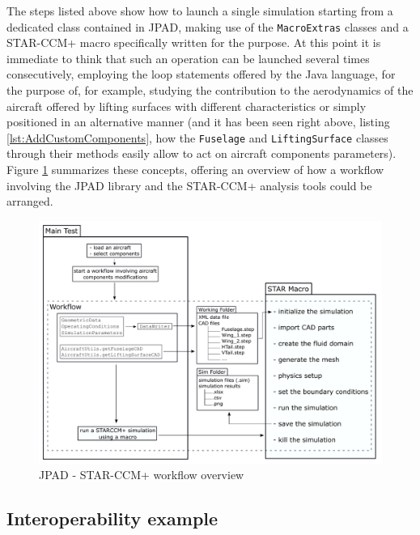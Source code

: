 \bigskip
\noindent
The steps listed above show how to launch a single simulation starting from a dedicated class contained in \gls{JPAD}, making use of the \lstinline[language=Java]!MacroExtras! classes and a STAR-CCM+ macro specifically written for the purpose. At this point it is immediate to think that such an operation can be launched several times consecutively, employing the loop statements offered by the Java language, for the purpose of, for example, studying the contribution to the aerodynamics of the aircraft offered by lifting surfaces with different characteristics or simply positioned in an alternative manner (and it has been seen right above, listing \ref{lst:AddCustomComponents}, how the \lstinline[language=Java]!Fuselage! and \lstinline[language=Java]!LiftingSurface! classes through their methods easily allow to act on aircraft components parameters). Figure \ref{fig:STARJPADWorkflow} summarizes these concepts, offering an overview of how a workflow involving the \gls{JPAD} library and the STAR-CCM+ analysis tools could be arranged.
%
\begin{figure}[H]
\centering
\includegraphics[scale=0.50]{Immagini/Capitolo4/starworkflow}
\caption{JPAD - STAR-CCM+ workflow overview}
\label{fig:STARJPADWorkflow}
\end{figure}
%  

\subsection{Interoperability example}
\label{sec4.4.3}

